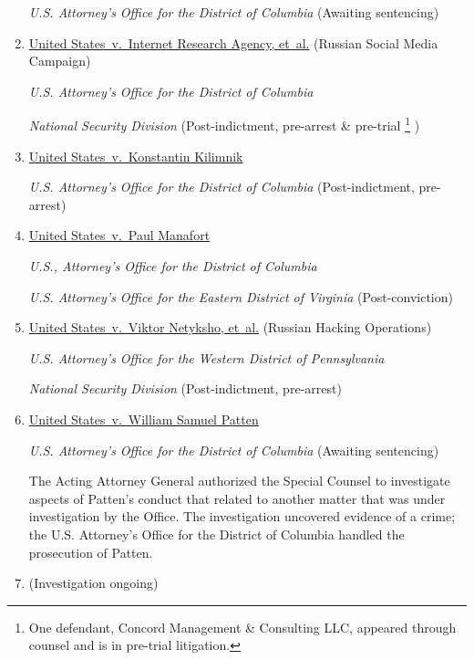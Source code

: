 \begin{enumerate}[1.]
\textit{U.S. Attorney's Office for the District of Columbia}\hfil\break
(Awaiting sentencing)

    \item \underline{United States~v.\ Internet Research Agency, et~al.} (Russian Social Media Campaign)

\textit{U.S. Attorney's Office for the District of Columbia}

\textit{National Security Division}\hfil\break
(Post-indictment, pre-arrest \& pre-trial%
\footnote{One defendant, Concord Management \& Consulting LLC, appeared through counsel and is in pre-trial litigation.}
)

    \item \underline{United States~v.\ Konstantin Kilimnik}

\textit{U.S. Attorney's Office for the District of Columbia}\hfil\break
(Post-indictment, pre-arrest)

    \item \underline{United States~v.\ Paul Manafort}

\textit{U.S., Attorney's Office for the District of Columbia}

\textit{U.S. Attorney's Office for the Eastern District of Virginia}\hfil\break
(Post-conviction)

    \item \underline{United States~v.\ Viktor Netyksho, et~al.} (Russian Hacking Operations)

\textit{U.S. Attorney's Office for the Western District of Pennsylvania}

\textit{National Security Division}\hfil\break
(Post-indictment, pre-arrest)

    \item \underline{United States~v.\ William Samuel Patten}

\textit{U.S. Attorney's Office for the District of Columbia}\hfil\break
(Awaiting sentencing)

The Acting Attorney General authorized the Special Counsel to investigate aspects of Patten's conduct that related to another matter that was under investigation by the Office.
The investigation uncovered evidence of a crime; the U.S. Attorney's Office for the District of Columbia handled the prosecution of Patten.

    \item \underline{}

\hfil\break
(Investigation ongoing)


\end{enumerate}
